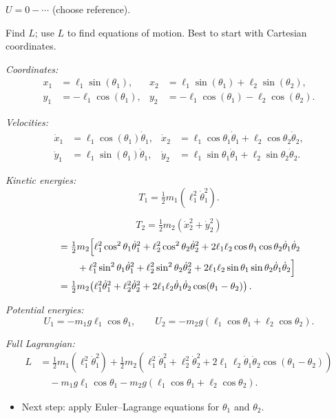 $U = 0 - \cdots$  (choose reference).

Find $L$; use $L$ to find equations of motion.  Best to start with Cartesian
coordinates.

\textit{Coordinates:}
\begin{align*}
    x_1 &= \ell_1\sin(\theta_1), & x_2 &= \ell_1\sin(\theta_1) + \ell_2\sin(\theta_2), \\
    y_1 &= -\ell_1\cos(\theta_1), & y_2 &= -\ell_1\cos(\theta_1) - \ell_2\cos(\theta_2).
\end{align*}

\textit{Velocities:}
\begin{align*}
    \dot{x}_1 &= \ell_1\cos(\theta_1)\dot{\theta}_1, &
    \dot{x}_2 &= \ell_1\cos\theta_1\dot{\theta}_1 + \ell_2\cos\theta_2\dot{\theta}_2, \\
    \dot{y}_1 &= \ell_1\sin(\theta_1)\dot{\theta}_1, &
    \dot{y}_2 &= \ell_1\sin\theta_1\dot{\theta}_1 + \ell_2\sin\theta_2\dot{\theta}_2.
\end{align*}

\textit{Kinetic energies:}
\[
    T_1 = \tfrac{1}{2}m_1(\ell_1^2\dot{\theta}_1^2).
\]

\[
    T_2 = \tfrac{1}{2}m_2(\dot{x}_2^2 + \dot{y}_2^2)
\]
\begin{align*}
    &= \tfrac{1}{2}m_2\Bigl[
        \ell_1^2\cos^2\theta_1\dot{\theta}_1^2 + \ell_2^2\cos^2\theta_2\dot{\theta}_2^2
        + 2\ell_1\ell_2\cos\theta_1\cos\theta_2\dot{\theta}_1\dot{\theta}_2 \\
    &\qquad + \ell_1^2\sin^2\theta_1\dot{\theta}_1^2 + \ell_2^2\sin^2\theta_2\dot{\theta}_2^2
        + 2\ell_1\ell_2\sin\theta_1\sin\theta_2\dot{\theta}_1\dot{\theta}_2
    \Bigr] \\
    &= \tfrac{1}{2}m_2\!\left(\ell_1^2\dot{\theta}_1^2 + \ell_2^2\dot{\theta}_2^2
        + 2\ell_1\ell_2\dot{\theta}_1\dot{\theta}_2\cos(\theta_1 - \theta_2)\right).
\end{align*}

\textit{Potential energies:}
\[
    U_1 = -m_1 g\ell_1\cos\theta_1, \qquad
    U_2 = -m_2 g(\ell_1\cos\theta_1 + \ell_2\cos\theta_2).
\]

\textit{Full Lagrangian:}
\begin{align*}
    L &= \tfrac{1}{2}m_1\!\left(\ell_1^2\dot{\theta}_1^2\right)
       + \tfrac{1}{2}m_2\!\left(\ell_1^2\dot{\theta}_1^2 + \ell_2^2\dot{\theta}_2^2
         + 2\ell_1\ell_2\dot{\theta}_1\dot{\theta}_2\cos(\theta_1-\theta_2)\right) \\
      &\quad - m_1 g\ell_1\cos\theta_1 - m_2 g(\ell_1\cos\theta_1 + \ell_2\cos\theta_2).
\end{align*}

\begin{itemize}
    \item Next step: apply Euler--Lagrange equations for $\theta_1$ and $\theta_2$.
\end{itemize}
